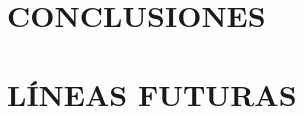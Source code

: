 \documentclass[a4paper, 12pt, spanish, twoside]{article}
\begin{document}
\clearpage





\newpage
\section{CONCLUSIONES} \label{sec:conclusiones}

\clearpage





\newpage
\section{LÍNEAS FUTURAS} \label{sec:lineas_futuras}

\clearpage





\newpage
\appto{\bibsetup}{\sloppy}
\printbibliography[heading=bibintoc, title=BIBLIOGRAFÍA] %

\clearpage









\end{document}
